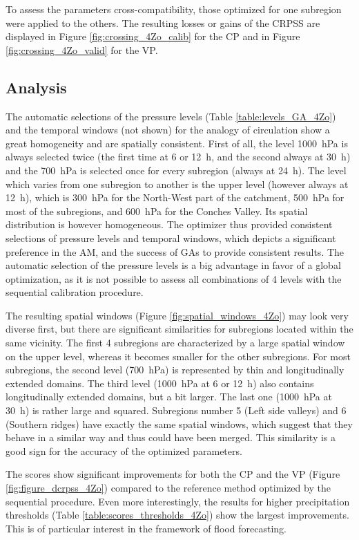 \documentclass[5p]{elsarticle}
\begin{document}
To assess the parameters cross-compatibility, those optimized for one subregion were applied to the others. The resulting losses or gains of the CRPSS are displayed in Figure \ref{fig:crossing_4Zo_calib} for the CP and in Figure \ref{fig:crossing_4Zo_valid} for the VP.


\subsection{Analysis}

The automatic selections of the pressure levels (Table \ref{table:levels_GA_4Zo}) and the temporal windows (not shown) for the analogy of circulation show a great homogeneity and are spatially consistent. First of all, the level 1000~hPa is always selected twice (the first time at 6 or 12~h, and the second always at 30~h) and the 700~hPa is selected once for every subregion (always at 24~h). The level which varies from one subregion to another is the upper level (however always at 12~h), which is 300~hPa for the North-West part of the catchment, 500~hPa for most of the subregions, and 600~hPa for the Conches Valley. Its spatial distribution is however homogeneous. The optimizer thus provided consistent selections of pressure levels and temporal windows, which depicts a significant preference in the AM, and the success of GAs to provide consistent results. The automatic selection of the pressure levels is a big advantage in favor of a global optimization, as it is not possible to assess all combinations of 4 levels with the sequential calibration procedure.

The resulting spatial windows (Figure \ref{fig:spatial_windows_4Zo}) may look very diverse first, but there are significant similarities for subregions located within the same vicinity. The first 4 subregions are characterized by a large spatial window on the upper level, whereas it becomes smaller for the other subregions. For most subregions, the second level (700~hPa) is represented by thin and longitudinally extended domains. The third level (1000~hPa at 6 or 12~h) also contains longitudinally extended domains, but a bit larger. The last one (1000~hPa at 30~h) is rather large and squared. Subregions number 5 (Left side valleys) and 6 (Southern ridges) have exactly the same spatial windows, which suggest that they behave in a similar way and thus could have been merged. This similarity is a good sign for the accuracy of the optimized parameters.

The scores show significant improvements for both the CP and the VP (Figure \ref{fig:figure_dcrpss_4Zo}) compared to the reference method optimized by the sequential procedure. Even more interestingly, the results for higher precipitation thresholds (Table \ref{table:scores_thresholds_4Zo}) show the largest improvements. This is of particular interest in the framework of flood forecasting.
\end{document}
